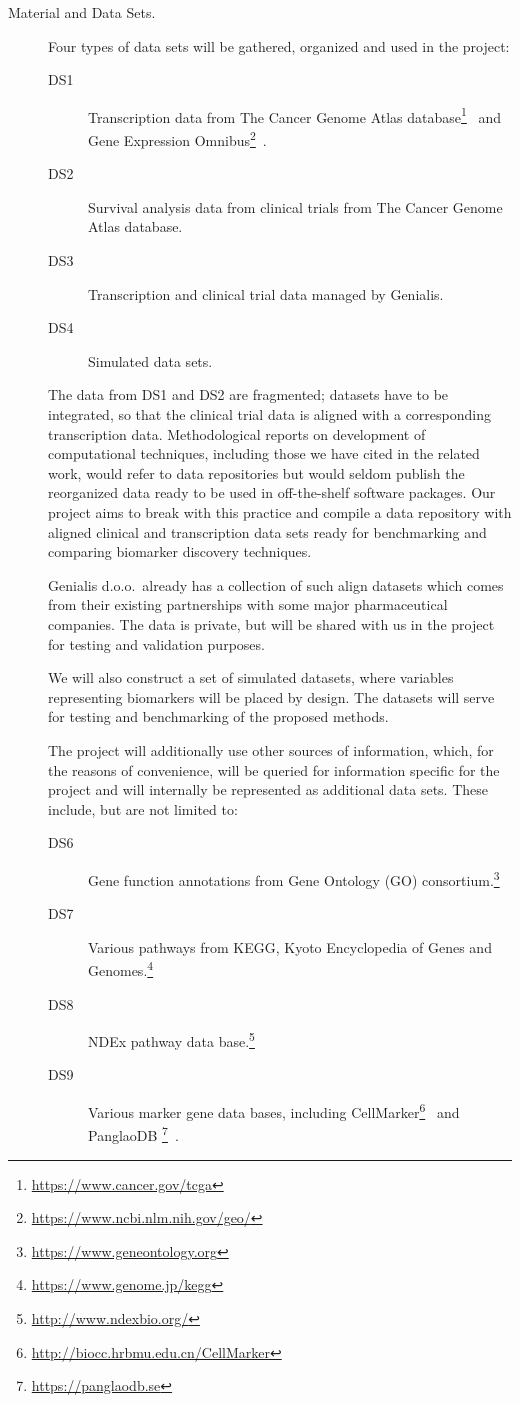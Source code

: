 \documentclass[11pt,a4paper]{article}
\newcommand{\myurl}[1]{\footnote{\url{#1}}}
\begin{document}
\begin{description}
	\item[Material and Data Sets.] Four types of data sets will be gathered, organized and used in the project:
	\begin{description}
		\item[DS1] Transcription data from The Cancer Genome Atlas database\myurl{https://www.cancer.gov/tcga}~\cite{24071849} and Gene Expression Omnibus\myurl{https://www.ncbi.nlm.nih.gov/geo/}~\cite{23193258}.
		\item[DS2] Survival analysis data from clinical trials from The Cancer Genome Atlas database.
		\item[DS3] Transcription and clinical trial data managed by Genialis.
		\item[DS4] Simulated data sets.
	\end{description}
	The data from DS1 and DS2 are fragmented; datasets have to be integrated, so that the clinical trial data is aligned with a corresponding transcription data. Methodological reports on development of computational techniques, including those we have cited in the related work, would refer to data repositories but would seldom publish the reorganized data ready to be used in off-the-shelf software packages. Our project aims to break with this practice and compile a data repository with aligned clinical and transcription data sets ready for benchmarking and comparing biomarker discovery techniques.

	Genialis d.o.o.~already has a collection of such align datasets which comes from their existing partnerships with some major pharmaceutical companies. The data is private, but will be shared with us in the project for testing and validation purposes.

	We will also construct a set of simulated datasets, where variables representing biomarkers will be placed by design. The datasets will serve for testing and benchmarking of the proposed methods.

	The project will additionally use other sources of information, which, for the reasons of convenience, will be queried for information specific for the project and will internally be represented as additional data sets. These include, but are not limited to:

	\begin{description}
		\item[DS6] Gene function annotations from Gene Ontology (GO) consortium.\myurl{https://www.geneontology.org}
		\item[DS7] Various pathways from KEGG, Kyoto Encyclopedia of Genes and Genomes.\myurl{https://www.genome.jp/kegg}
		\item[DS8] NDEx pathway data base.\myurl{http://www.ndexbio.org/}
		\item[DS9] Various marker gene data bases, including CellMarker\myurl{http://biocc.hrbmu.edu.cn/CellMarker}~\cite{cellmarker} and PanglaoDB
		\myurl{https://panglaodb.se}~\cite{30951143}.
	\end{description}


\end{description}
\end{document}
